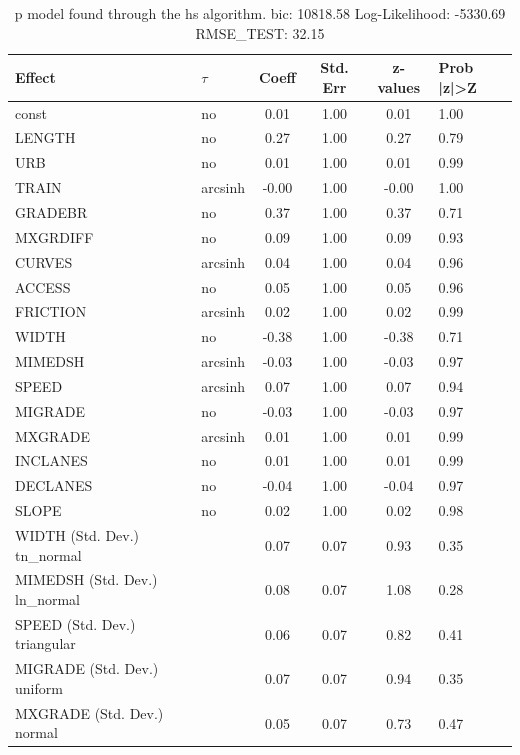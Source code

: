 \begin{table}
	\caption{p model found through the hs algorithm. bic: 10818.58 Log-Likelihood: -5330.69 RMSE_TEST: 32.15}
	\begin{center}
		\begin{tabular}{|l|l|c|c|c|l|}
			\hline
			Effect & $\tau$ & Coeff & Std. Err & z-values & Prob |z|>Z \\
			\hline
			const & no & 0.01 & 1.00 & 0.01 & 1.00 \\
			\hline
			LENGTH & no & 0.27 & 1.00 & 0.27 & 0.79 \\
			\hline
			URB & no & 0.01 & 1.00 & 0.01 & 0.99 \\
			\hline
			TRAIN & arcsinh & -0.00 & 1.00 & -0.00 & 1.00 \\
			\hline
			GRADEBR & no & 0.37 & 1.00 & 0.37 & 0.71 \\
			\hline
			MXGRDIFF & no & 0.09 & 1.00 & 0.09 & 0.93 \\
			\hline
			CURVES & arcsinh & 0.04 & 1.00 & 0.04 & 0.96 \\
			\hline
			ACCESS & no & 0.05 & 1.00 & 0.05 & 0.96 \\
			\hline
			FRICTION & arcsinh & 0.02 & 1.00 & 0.02 & 0.99 \\
			\hline
			WIDTH & no & -0.38 & 1.00 & -0.38 & 0.71 \\
			\hline
			MIMEDSH & arcsinh & -0.03 & 1.00 & -0.03 & 0.97 \\
			\hline
			SPEED & arcsinh & 0.07 & 1.00 & 0.07 & 0.94 \\
			\hline
			MIGRADE & no & -0.03 & 1.00 & -0.03 & 0.97 \\
			\hline
			MXGRADE & arcsinh & 0.01 & 1.00 & 0.01 & 0.99 \\
			\hline
			INCLANES & no & 0.01 & 1.00 & 0.01 & 0.99 \\
			\hline
			DECLANES & no & -0.04 & 1.00 & -0.04 & 0.97 \\
			\hline
			SLOPE & no & 0.02 & 1.00 & 0.02 & 0.98 \\
			\hline
			WIDTH (Std. Dev.) tn_normal &  & 0.07 & 0.07 & 0.93 & 0.35 \\
			\hline
			MIMEDSH (Std. Dev.) ln_normal &  & 0.08 & 0.07 & 1.08 & 0.28 \\
			\hline
			SPEED (Std. Dev.) triangular &  & 0.06 & 0.07 & 0.82 & 0.41 \\
			\hline
			MIGRADE (Std. Dev.) uniform &  & 0.07 & 0.07 & 0.94 & 0.35 \\
			\hline
			MXGRADE (Std. Dev.) normal &  & 0.05 & 0.07 & 0.73 & 0.47 \\

\end{tabular}
\end{center}
\end{table}
